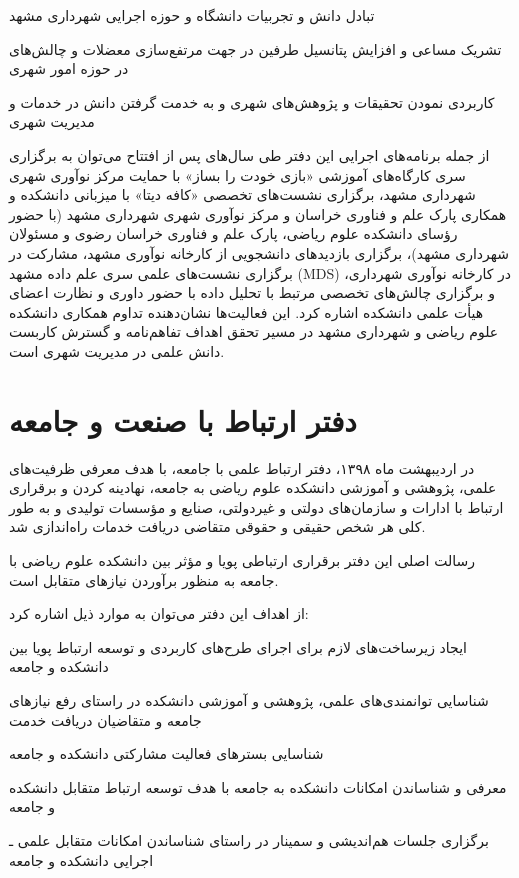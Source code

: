 \documentclass[
  letterpaper,
  DIV=11,
  numbers=noendperiod]{scrreprt}
\begin{document}
تبادل دانش و تجربیات دانشگاه و حوزه اجرایی شهرداری مشهد

تشریک مساعی و افزایش پتانسیل طرفین در جهت مرتفع‌سازی معضلات و چالش‌های در
حوزه امور شهری

کاربردی نمودن تحقیقات و پژوهش‌های شهری و به خدمت گرفتن دانش در خدمات و
مدیریت شهری

از جمله برنامه‌های اجرایی این دفتر طی سال‌های پس از افتتاح می‌توان به
برگزاری سری کارگاه‌های آموزشی «بازی خودت را بساز» با حمایت مرکز نوآوری
شهری شهرداری مشهد، برگزاری نشست‌های تخصصی «کافه دیتا» با میزبانی دانشکده
و همکاری پارک علم و فناوری خراسان و مرکز نوآوری شهری شهرداری مشهد (با
حضور رؤسای دانشکده علوم ریاضی، پارک علم و فناوری خراسان رضوی و مسئولان
شهرداری مشهد)، برگزاری بازدیدهای دانشجویی از کارخانه نوآوری مشهد، مشارکت
در برگزاری نشست‌های علمی سری علم داده مشهد (MDS) در کارخانه نوآوری
شهرداری، و برگزاری چالش‌های تخصصی مرتبط با تحلیل داده با حضور داوری و
نظارت اعضای هیأت علمی دانشکده اشاره کرد. این فعالیت‌ها نشان‌دهنده تداوم
همکاری دانشکده علوم ریاضی و شهرداری مشهد در مسیر تحقق اهداف تفاهم‌نامه و
گسترش کاربست دانش علمی در مدیریت شهری است.

\section{دفتر ارتباط با صنعت و
جامعه}\label{ux62fux641ux62aux631-ux627ux631ux62aux628ux627ux637-ux628ux627-ux635ux646ux639ux62a-ux648-ux62cux627ux645ux639ux647}

در اردیبهشت ماه ۱۳۹۸، دفتر ارتباط علمی با جامعه، با هدف معرفی ظرفیت‌های
علمی، پژوهشی و آموزشی دانشکده علوم ریاضی به جامعه، نهادینه کردن و
برقراری ارتباط با ادارات و سازمان‌های دولتی و غیردولتی، صنایع و مؤسسات
تولیدی و به طور کلی هر شخص حقیقی و حقوقی متقاضی دریافت خدمات راه‌اندازی
شد.

رسالت اصلی این دفتر برقراری ارتباطی پویا و مؤثر بین دانشکده علوم ریاضی
با جامعه به منظور برآوردن نیازهای متقابل است.

از اهداف این دفتر می‌توان به موارد ذیل اشاره کرد:

ایجاد زیرساخت‌های لازم برای اجرای طرح‌های کاربردی و توسعه ارتباط پویا بین
دانشکده و جامعه

شناسایی توانمندی‌های علمی، پژوهشی و آموزشی دانشکده در راستای رفع نیازهای
جامعه و متقاضیان دریافت خدمت

شناسایی بسترهای فعالیت مشارکتی دانشکده و جامعه

معرفی و شناساندن امکانات دانشکده به جامعه با هدف توسعه ارتباط متقابل
دانشکده و جامعه

برگزاری جلسات هم‌اندیشی و سمینار در راستای شناساندن امکانات متقابل علمی ـ
اجرایی دانشکده و جامعه
\end{document}
